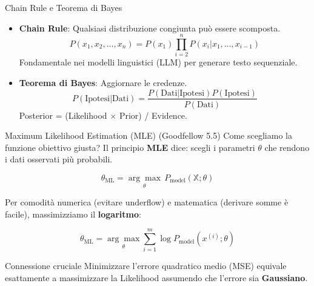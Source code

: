 \documentclass[aspectratio=169, 10pt]{beamer}
\begin{document}
\begin{frame}{Chain Rule e Teorema di Bayes}
    \begin{itemize}
        \item \textbf{Chain Rule}: Qualsiasi distribuzione congiunta può essere scomposta.
        \[ P(x_1, x_2, \dots, x_n) = P(x_1) \prod_{i=2}^n P(x_i | x_1, \dots, x_{i-1}) \]
        Fondamentale nei modelli linguistici (LLM) per generare testo sequenziale.
        
        \item \textbf{Teorema di Bayes}: Aggiornare le credenze.
        \[ P(\text{Ipotesi} | \text{Dati}) = \frac{P(\text{Dati} | \text{Ipotesi}) P(\text{Ipotesi})}{P(\text{Dati})} \]
        Posterior = (Likelihood $\times$ Prior) / Evidence.
    \end{itemize}
\end{frame}

\begin{frame}{Maximum Likelihood Estimation (MLE) (Goodfellow 5.5)}
    Come scegliamo la funzione obiettivo giusta? Il principio \textbf{MLE} dice: scegli i parametri $\theta$ che rendono i dati osservati più probabili.
    
    \[ \theta_{\text{ML}} = \underset{\theta}{\arg\max} \, P_{\text{model}}(\mathbb{X}; \theta) \]
    
    Per comodità numerica (evitare underflow) e matematica (derivare somme è facile), massimizziamo il \textbf{logaritmo}:
    
    \[ \theta_{\text{ML}} = \underset{\theta}{\arg\max} \sum_{i=1}^m \log P_{\text{model}}(x^{(i)}; \theta) \]
    
    \begin{alertblock}{Connessione cruciale}
        Minimizzare l'errore quadratico medio (MSE) equivale esattamente a massimizzare la Likelihood assumendo che l'errore sia \textbf{Gaussiano}.
    \end{alertblock}
\end{frame}
\end{document}
